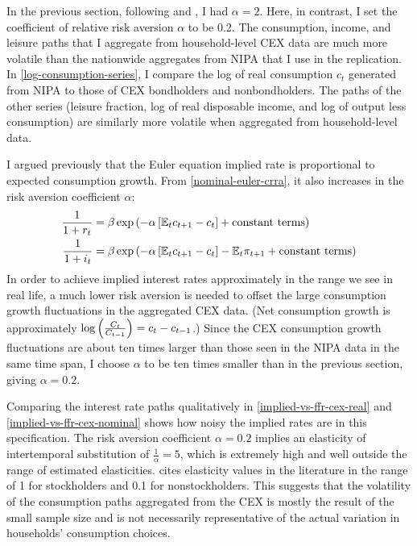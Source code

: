 In the previous section, following \cite{canzoneri07} and \cite{collard11}, I had $\alpha = 2$. Here, in contrast, I set the coefficient of relative risk aversion $\alpha$ to be 0.2. The consumption, income, and leisure paths that I aggregate from household-level CEX data are much more volatile than the nationwide aggregates from NIPA that I use in the replication. In \autoref{log-consumption-series}, I compare the log of real consumption $c_t$ generated from NIPA to those of CEX bondholders and nonbondholders. The paths of the other series (leisure fraction, log of real disposable income, and log of output less consumption) are similarly more volatile when aggregated from household-level data.

I argued previously that the Euler equation implied rate is proportional to expected consumption growth. From \eqref{nominal-euler-crra}, it also increases in the risk aversion coefficient $\alpha$:
\begin{align*}
\frac{1}{1 + r_t} &= \beta \exp \left(  -\alpha \left[  \mathbb{E}_t c_{t+1} - c_t  \right] + \mathrm{constant\ terms}  \right) \\
\frac{1}{1 + i_t} &= \beta \exp \left(  -\alpha \left[  \mathbb{E}_t c_{t+1} - c_t  \right] - \mathbb{E}_t \pi_{t+1} + \mathrm{constant\ terms}  \right)
\end{align*}
In order to achieve implied interest rates approximately in the range we see in real life, a much lower risk aversion is needed to offset the large consumption growth fluctuations in the aggregated CEX data. (Net consumption growth is approximately $\log \left( \frac{C_t}{C_{t-1}} \right) = c_t - c_{t-1}$.) Since the CEX consumption growth fluctuations are about ten times larger than those seen in the NIPA data in the same time span, I choose $\alpha$ to be ten times smaller than in the previous section, giving $\alpha = 0.2$.

Comparing the interest rate paths qualitatively in \autoref{implied-vs-ffr-cex-real} and \autoref{implied-vs-ffr-cex-nominal} shows how noisy the implied rates are in this specification. The risk aversion coefficient $\alpha = 0.2$ implies an elasticity of intertemporal substitution of $\frac{1}{\alpha} = 5$, which is extremely high and well outside the range of estimated elasticities. \cite{guvenen06} cites elasticity values in the literature in the range of 1 for stockholders and 0.1 for nonstockholders. This suggests that the volatility of the consumption paths aggregated from the CEX is mostly the result of the small sample size and is not necessarily representative of the actual variation in households' consumption choices.

